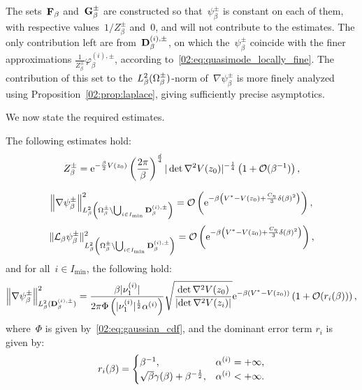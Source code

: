         The sets~$\mathbf{F}_\beta$ and~$\mathbf{G}_\beta^{\pm}$ are constructed so that~$\psi_\beta^\pm$ is constant on each of them, with respective values~$1/Z_\beta^{\pm}$ and~$0$, and will not contribute to the estimates.
        The only contribution left are from~$\mathbf{D}_\beta^{(i),\pm}$, on which the~$\psi_\beta^\pm$ coincide with the finer approximations $\frac1{Z_\beta^{\pm}}\varphi_\beta^{(i),\pm}$, according to~\eqref{02:eq:quasimode_locally_fine}. The contribution of this set to the~$L_\beta^2(\Omega_\beta^\pm)$-norm of~$\nabla\psi_\beta^\pm$ is more finely analyzed using Proposition~\ref{02:prop:laplace}, giving sufficiently precise asymptotics.

        We now state the required estimates.
        \begin{proposition}
            \label{02:prop:semiclassical_estimates}
            The following estimates hold:
            \begin{equation}
                \label{02:eq:laplace_partition_function}
                Z_\beta^\pm = \mathrm{e}^{-\frac{\beta}2 V(z_0)} \left(\frac{2\pi}{\beta}\right)^{\frac d4}|\det \nabla^2 V(z_0)|^{-\frac14}\left(1+\mathcal{O}(\beta^{-1})\right),
            \end{equation}

            \begin{equation}
                \label{02:eq:laplace_high_energy}
                \left\|\nabla \psi_\beta^\pm\right\|^2_{L_\beta^2\left(\Omega_\beta^\pm \setminus \bigcup_{i\in{I_{\min}}} \mathbf{D}_\beta^{(i),\pm}\right)} = \mathcal{O}\left(\mathrm{e}^{-\beta\left(V^* - V(z_0) +\frac{C_\eta}3 \delta(\beta)^2\right)}\right),
            \end{equation}
            \begin{equation}
                \label{02:eq:laplace_generator_high_energy}
                \|\mathcal{L}_\beta \psi_\beta^\pm\|^2_{L_\beta^2\left(\Omega_\beta^\pm \setminus \bigcup_{i\in{I_{\min}}} \mathbf{D}_\beta^{(i),\pm}\right)} = \mathcal{O}\left(\mathrm{e}^{-\beta\left(V^* - V(z_0) +\frac{C_\eta}3 \delta(\beta)^2\right)}\right),
            \end{equation}
            and for all~$i\in I_{\min}$, the following hold:
            \begin{equation}
                \label{02:eq:laplace_local_estimate}
                \left\|\nabla \psi_\beta^\pm\right\|^2_{L_\beta^2(\mathbf{D}_\beta^{(i),\pm})} = \frac{\beta|\nu^{(i)}_{1}|}{2\pi\Phi\left(|\nu^{(i)}_{1}|^{\frac12}\alpha^{(i)}\right)}\sqrt{\frac{\det \nabla^2 V(z_0)}{\left|\det \nabla ^2 V(z_i)\right|}} \mathrm{e}^{-\beta(V^*-V(z_0))} \left(1 +\mathcal{O}(r_i(\beta))\right),
            \end{equation}
            where~$\Phi$ is given by~\eqref{02:eq:gaussian_cdf}, and the dominant error term $r_i$ is given by:
            \begin{equation}
                \label{02:eq:laplace_error_terms}
                r_i(\beta)=\begin{cases}
                    \beta^{-1}, & \alpha^{(i)} = +\infty,\\
                    \sqrt\beta\gamma(\beta)+\beta^{-\frac12}, & \alpha^{(i)} < +\infty.
                \end{cases}
            \end{equation}
            

\end{proposition}
